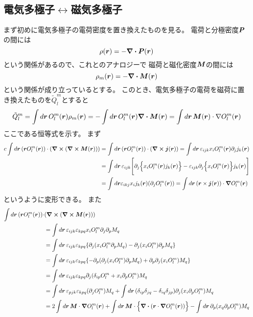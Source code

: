 \documentclass[../../master.tex]{subfiles}
\begin{document}
\subsection{電気多極子\(\leftrightarrow\)磁気多極子}
まず初めに電気多極子の電荷密度を置き換えたものを見る。
電荷と分極密度\(\vb*{P}\)の間には
\begin{equation}
    \rho(\vb*{r}) = -\div\vb*{P}(\vb*{r})
\end{equation}
という関係があるので、これとのアナロジーで
磁荷と磁化密度\(\vb*{M}\)の間には
\begin{equation}
    \rho_m(\vb*{r}) = -\div\vb*{M}(\vb*{r})
\end{equation}
という関係が成り立っているとする。
このとき、電気多極子の電荷を磁荷に置き換えたものを\(\tilde{Q}_l^m\)とすると
\begin{align}
    \tilde{Q}_l^m
    = \int d\vb*{r}\, O_l^m(\vb*{r})\rho_m(\vb*{r})
    = -\int d\vb*{r}\, O_l^m(\vb*{r})\div\vb*{M}(\vb*{r})
    = \int d\vb*{r}\, \vb*{M}(\vb*{r})\cdot \nabla O_l^m(\vb*{r})
\end{align}
ここである恒等式を示す。
まず
\begin{align}
    c\int d\vb*{r}\, (\vb*{r}O_l^m(\vb*{r}))\cdot (\curl (\curl\vb*{M}(\vb*{r})))
    &=\int d\vb*{r}\, (\vb*{r}O_l^m(\vb*{r}))\cdot(\curl \vb*{j}(\vb*{r}))
    =\int d\vb*{r}\, \varepsilon_{ijk} x_i O_l^m(\vb*{r}) \partial_j j_k(\vb*{r})\\
    &= \int d\vb*{r}\,\varepsilon_{ijk} \Biggl[\partial_j \Bigl\{ x_i O_l^m(\vb*{r}) j_k(\vb*{r})\Bigr\}
    -  \varepsilon_{ijk}\partial_j\Bigl\{x_i O_l^m(\vb*{r})\Bigr\} j_k(\vb*{r})\Biggr]\\
    &=\int d\vb*{r}\varepsilon_{ikj} x_i j_k(\vb*{r}) (\partial_j O_l^m(\vb*{r}))
    =\int d\vb*{r}\, (\vb*{r}\times\vb*{j}(\vb*{r}))\cdot \grad O_l^m(\vb*{r})
\end{align}
というように変形できる。
また
\begin{align}
    \int d\vb*{r}\, (\vb*{r}O_l^m(\vb*{r}))\cdot&(\curl (\curl\vb*{M}(\vb*{r}))) \notag\\
    &=\int d\vb*{r}\, \varepsilon_{ijk}\varepsilon_{kpq} x_i O_l^m \partial_j \partial_p M_q\\
    &=\int d\vb*{r}\, \varepsilon_{ijk}\varepsilon_{kpq}
    \qty{\partial_j(x_i O_l^m \partial_p M_q)-\partial_j(x_i O_l^m)\partial_p M_q}\\
    &=\int d\vb*{r}\, \varepsilon_{ijk}\varepsilon_{kpq}
    \qty{-\partial_p(\partial_j(x_i O_l^m)\partial_p M_q)+ \partial_p\partial_j(x_iO_l^m)M_q}\\
    &=\int d\vb*{r}\, \varepsilon_{ijk}\varepsilon_{kpq}
    \partial_j(\delta_{ip}O_l^m + x_i\partial_pO_l^m)M_q\\
    &=\int d\vb*{r}\, \varepsilon_{pjk}\varepsilon_{kpq} (\partial_j O_l^m)M_q
    +\int d\vb*{r}\, (\delta_{ip}\delta_{jq}-\delta_{iq}\delta_{jp})\partial_j(x_i\partial_p O_l^m)M_q\\
    &=2\int d\vb*{r}\, \vb*{M}\cdot\grad O_l^m(\vb*{r})
    + \int d\vb*{r}\, \vb*{M} \cdot \Bigl\{\div(\vb*{r}\cdot \grad O_l^m(\vb*{r}))\Bigr\}
    -\int d\vb*{r}\, \partial_p(x_q\partial_p O_l^m) M_q
\end{align}
\end{document}

